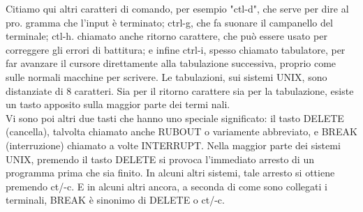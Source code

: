Citiamo qui altri caratteri di comando, per esempio "ctl-d", che serve per dire al pro.
gramma che l'input è terminato; ctrl-g, che fa suonare il campanello del terminale; ctl-h.
chiamato anche ritorno carattere, che può essere usato per correggere gli errori di
battitura; e infine ctrl-i, spesso chiamato tabulatore, per far avanzare il cursore direttamente
alla tabulazione successiva, proprio come sulle normali macchine per scrivere.
Le tabulazioni, sui sistemi UNIX, sono distanziate di 8 caratteri. Sia per il ritorno carattere sia per la tabulazione, esiste un tasto apposito sulla maggior parte dei termi
nali.\\
Vi sono poi altri due tasti che hanno uno speciale significato: il tasto DELETE
(cancella), talvolta chiamato anche RUBOUT o variamente abbreviato, e BREAK
(interruzione) chiamato a volte INTERRUPT. Nella maggior parte dei sistemi
UNIX, premendo il tasto DELETE si provoca l'immediato arresto di un programma
prima che sia finito. In alcuni altri sistemi, tale arresto si ottiene premendo ct/-c. E in
alcuni altri ancora, a seconda di come sono collegati i terminali, BREAK è sinonimo
di DELETE o ct/-c.
